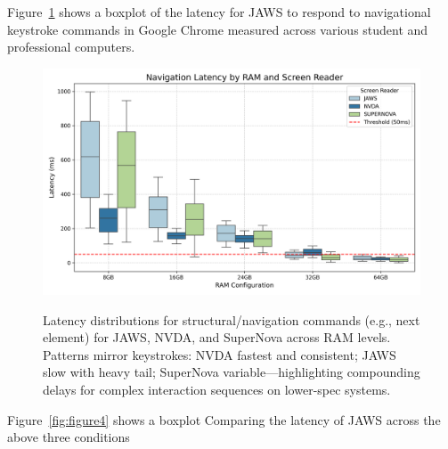 Figure~\ref{fig:figure3} shows a boxplot of the latency for JAWS to respond to navigational keystroke commands in Google Chrome measured across various student and professional computers.
\begin{figure}[htbp]
	\includegraphics[alt={Boxplots of navigation command latency (ms) across RAM for JAWS, NVDA, SuperNova; NVDA fastest, JAWS slowest, SuperNova mid with variability and RAM-driven improvement.}]{images/navigation_latency.png}
	\caption[Navigation command latency by RAM]{Latency distributions for structural/navigation commands (e.g., next element) for JAWS, NVDA, and SuperNova across RAM levels. Patterns mirror keystrokes: NVDA fastest and consistent; JAWS slow with heavy tail; SuperNova variable—highlighting compounding delays for complex interaction sequences on lower-spec systems.}\label{fig:figure3}
	\tagstructend
\end{figure}

Figure~\ref{fig:figure4} shows a boxplot Comparing the latency of JAWS across the above three conditions

